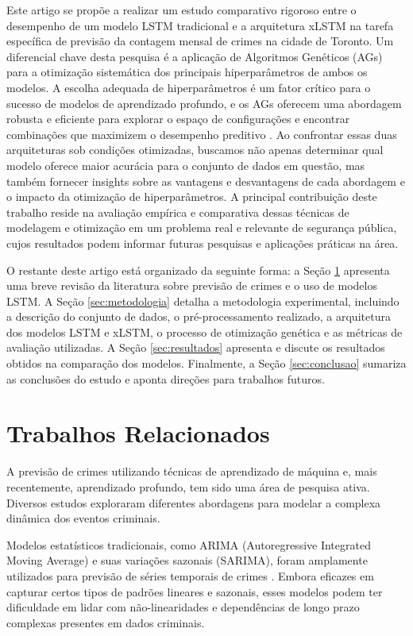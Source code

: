 \documentclass[conference]{IEEEtran}
\begin{document}
Este artigo se propõe a realizar um estudo comparativo rigoroso entre o desempenho de um modelo LSTM tradicional e a arquitetura xLSTM na tarefa específica de previsão da contagem mensal de crimes na cidade de Toronto. Um diferencial chave desta pesquisa é a aplicação de Algoritmos Genéticos (AGs) para a otimização sistemática dos principais hiperparâmetros de ambos os modelos. A escolha adequada de hiperparâmetros é um fator crítico para o sucesso de modelos de aprendizado profundo, e os AGs oferecem uma abordagem robusta e eficiente para explorar o espaço de configurações e encontrar combinações que maximizem o desempenho preditivo \cite{b4}. Ao confrontar essas duas arquiteturas sob condições otimizadas, buscamos não apenas determinar qual modelo oferece maior acurácia para o conjunto de dados em questão, mas também fornecer insights sobre as vantagens e desvantagens de cada abordagem e o impacto da otimização de hiperparâmetros. A principal contribuição deste trabalho reside na avaliação empírica e comparativa dessas técnicas de modelagem e otimização em um problema real e relevante de segurança pública, cujos resultados podem informar futuras pesquisas e aplicações práticas na área.

O restante deste artigo está organizado da seguinte forma: a Seção \ref{sec:trabalhos_relacionados} apresenta uma breve revisão da literatura sobre previsão de crimes e o uso de modelos LSTM. A Seção \ref{sec:metodologia} detalha a metodologia experimental, incluindo a descrição do conjunto de dados, o pré-processamento realizado, a arquitetura dos modelos LSTM e xLSTM, o processo de otimização genética e as métricas de avaliação utilizadas. A Seção \ref{sec:resultados} apresenta e discute os resultados obtidos na comparação dos modelos. Finalmente, a Seção \ref{sec:conclusao} sumariza as conclusões do estudo e aponta direções para trabalhos futuros.

\section{Trabalhos Relacionados}
\label{sec:trabalhos_relacionados}
A previsão de crimes utilizando técnicas de aprendizado de máquina e, mais recentemente, aprendizado profundo, tem sido uma área de pesquisa ativa. Diversos estudos exploraram diferentes abordagens para modelar a complexa dinâmica dos eventos criminais.

Modelos estatísticos tradicionais, como ARIMA (Autoregressive Integrated Moving Average) e suas variações sazonais (SARIMA), foram amplamente utilizados para previsão de séries temporais de crimes \cite{b6}. Embora eficazes em capturar certos tipos de padrões lineares e sazonais, esses modelos podem ter dificuldade em lidar com não-linearidades e dependências de longo prazo complexas presentes em dados criminais.
\end{document}

